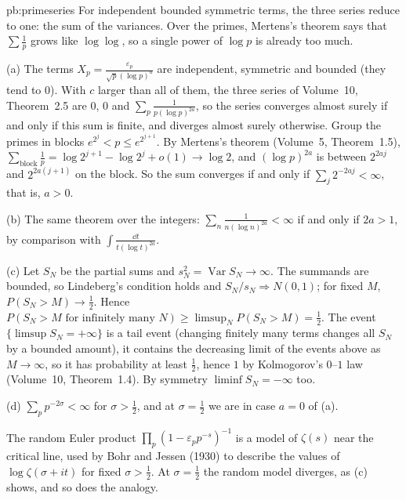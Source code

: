 \begin{solution}{pb:primeseries}
\idea For independent bounded symmetric terms, the three series reduce to one: the sum of the variances. Over the primes, Mertens's theorem says that $\sum\frac1p$ grows like
$\log\log$, so a single power of $\log p$ is already too much.

\writeup (a) The terms $X_p=\frac{\varepsilon_p}{\sqrt p(\log p)^a}$ are independent, symmetric and bounded (they tend to $0$). With $c$ larger than all of them, the three
series of Volume~10, Theorem~2.5 are $0$, $0$ and $\sum_p\frac1{p(\log p)^{2a}}$, so the series converges almost surely if and only if this sum is finite, and
diverges almost surely otherwise. Group the primes in blocks $e^{2^j}<p\le e^{2^{j+1}}$. By Mertens's theorem (Volume~5, Theorem~1.5),
$\sum_{\text{block}}\frac1p=\log2^{j+1}-\log2^j+o(1)\to\log2$, and $(\log p)^{2a}$ is between $2^{2aj}$ and $2^{2a(j+1)}$ on the block. So the sum converges if and only if
$\sum_j2^{-2aj}<\infty$, that is, $a>0$.

(b) The same theorem over the integers: $\sum_n\frac1{n(\log n)^{2a}}<\infty$ if and only if $2a>1$, by comparison with $\int\frac{\dd t}{t(\log t)^{2a}}$.

(c) Let $S_N$ be the partial sums and $s_N^2=\operatorname{Var}S_N\to\infty$. The summands are bounded, so Lindeberg's condition holds and $S_N/s_N\Rightarrow N(0,1)$; for fixed $M$,
$P(S_N>M)\to\frac12$. Hence $P(S_N>M\text{ for infinitely many }N)\ge\limsup_NP(S_N>M)=\frac12$. The event $\{\limsup S_N=+\infty\}$ is a tail event (changing finitely many terms
changes all $S_N$ by a bounded amount), it contains the decreasing limit of the events above as $M\to\infty$, so it has probability at least $\frac12$, hence $1$ by
Kolmogorov's $0$--$1$ law (Volume~10, Theorem~1.4). By symmetry $\liminf S_N=-\infty$ too.

(d) $\sum_pp^{-2\sigma}<\infty$ for $\sigma>\frac12$, and at $\sigma=\frac12$ we are in case $a=0$ of (a).

\leads The random Euler product $\prod_p(1-\varepsilon_pp^{-s})^{-1}$ is a model of $\zeta(s)$ near the critical line, used by Bohr and Jessen (1930) to describe the values of
$\log\zeta(\sigma+it)$ for fixed $\sigma>\frac12$. At $\sigma=\frac12$ the random model diverges, as (c) shows, and so does the analogy.
\end{solution}

